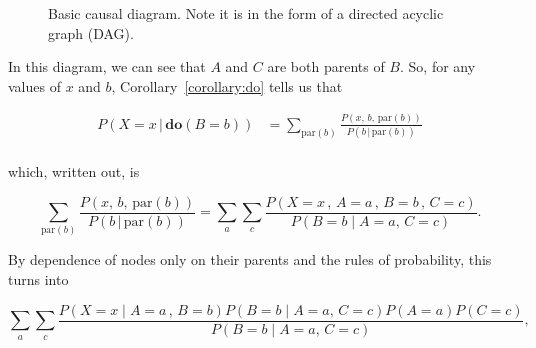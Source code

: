 \documentclass{article}
\begin{document}
\begin{figure}[h]
    \centering
    \caption{Basic causal diagram. Note it is in the form of a directed acyclic graph (DAG).}
    \label{fig:causal_dia}
\end{figure}

In this diagram, we can see that $A$ and $C$ are both parents of $B$. So, for any values of $x$ and $b$, 
Corollary~\ref{corollary:do} tells us that

\begin{align*}
    P(X = x \,|\, \textbf{do}(B=b)) &= \sum_{\text{par}(b)}\frac{P(x, \,b, \,\text{par}(b))}{P(b\,|\, \text{par}(b))} \\
\end{align*}

which, written out, is 

\begin{equation*}
    \sum_{\text{par}(b)}\frac{P(x, \,b, \,\text{par}(b))}{P(b\,|\, \text{par}(b))} = \sum_{a}\sum_{c}\frac{P(X=x\,, \, A=a\,,\, B=b \, ,\, C=c)}{P(B=b \;|\; A=a,\, C=c)}.
\end{equation*}

By dependence of nodes only on their parents and the rules of probability, this turns into

\begin{equation*}
    \sum_{a}\sum_{c}\frac{P(X=x\;|\; A=a\,,\, B=b)P(B=b\;|\; A=a,\, C=c)P(A=a)P(C=c)}{P(B=b \;|\; A=a,\, C=c)},
\end{equation*}
\end{document}
